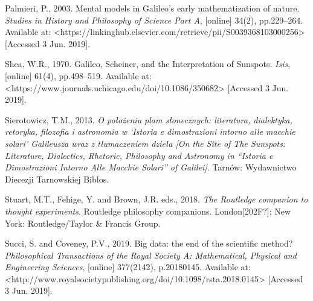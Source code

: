 \begin{artengenv}
Palmieri, P., 2003. Mental models in Galileo’s early mathematization of nature. \textit{Studies in History and
Philosophy of Science Part A}, [online] 34(2), pp.229–264. Available at:
{\textless}https://linkinghub.elsevier.com/retrieve/pii/S0039368103000256{\textgreater} [Accessed 3 Jun. 2019].

Shea, W.R., 1970. Galileo, Scheiner, and the Interpretation of Sunspots. \textit{Isis}, [online] 61(4), pp.498–519.
Available at: {\textless}https://www.journals.uchicago.edu/doi/10.1086/350682{\textgreater} [Accessed 3 Jun. 2019].

Sierotowicz, T.M., 2013. \textit{O położeniu plam słonecznych: literatura, dialektyka, retoryka, filozofia i astronomia
w ‘Istoria e dimostrazioni intorno alle macchie solari’ Galileusza wraz z tłumaczeniem dzieła [On the Site of The
Sunspots: Literature, Dialectics, Rhetoric, Philosophy and Astronomy in “Istoria e Dimostrazioni Intorno Alle Macchie
Solari” of Galilei]}. Tarnów: Wydawnictwo Diecezji Tarnowskiej Biblos.

Stuart, M.T., Fehige, Y. and Brown, J.R. eds., 2018. \textit{The Routledge companion to thought experiments}. Routledge
philosophy companions. London[202F?]; New York: Routledge/Taylor \& Francis Group.

Succi, S. and Coveney, P.V., 2019. Big data: the end of the scientific method? \textit{Philosophical Transactions of the
Royal Society A: Mathematical, Physical and Engineering Sciences}, [online] 377(2142), p.20180145. Available at:
{\textless}http://www.royalsocietypublishing.org/doi/10.1098/rsta.2018.0145{\textgreater} [Accessed 3 Jun. 2019].

\end{artengenv}